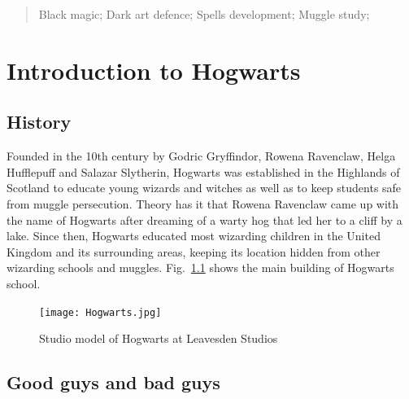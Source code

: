 \documentclass{swfuthesise}
\begin{document}
\maketitle
{}

\begin{abstract}
  \lipsum[1-3]

  \begin{keyword}
    Black magic; Dark art defence; Spells development; Muggle study;
  \end{keyword}
\end{abstract}

\tableofcontents %

\clearpage
{}

\chapter{Introduction to Hogwarts}
\label{cha:intr-hogw}

\section{History}
\label{sec:history}

Founded in the 10th century by Godric Gryffindor, Rowena Ravenclaw, Helga Hufflepuff and
Salazar Slytherin, Hogwarts was established in the Highlands of Scotland to educate young
wizards and witches as well as to keep students safe from muggle
persecution.\cite{harrypotter} Theory has it that Rowena Ravenclaw came up with the name
of Hogwarts after dreaming of a warty hog that led her to a cliff by a lake. Since then,
Hogwarts educated most wizarding children in the United Kingdom and its surrounding areas,
keeping its location hidden from other wizarding schools and
muggles.\cite{nla.cat-vn992642,nla.cat-vn7290756} Fig.~\ref{fig:hogwarts} shows the main building of Hogwarts school.


\begin{figure}
  \centering%
  \texttt{[image: Hogwarts.jpg]}
  \caption{Studio model of Hogwarts at Leavesden Studios\label{fig:hogwarts}}
\end{figure}

\lipsum[3-4]

\section{Good guys and bad guys}
\end{document}
